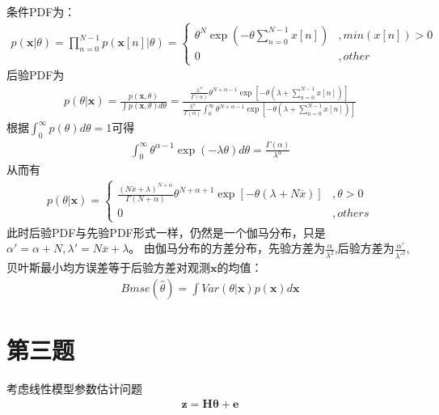 \documentclass[fontset=windows]{article}
\numberwithin{figure}{section}
\begin{document}
条件PDF为：
\begin{align*}
	p(\mathbf{x}|\theta)=\prod_{n=0}^{N-1}p(\mathbf{x}[n]|\theta)=
	\left\{
	\begin{matrix}
		\theta^N\exp(-\theta \sum_{n=0}^{N-1} x[n]) & ,min(x[n])>0 \\
		0                                           & ,other
	\end{matrix}
	\right.
\end{align*}
后验PDF为
\begin{align*}
	p(\theta|\mathbf{x})=\frac{p(\mathbf{x},\theta)}{\int p(\mathbf{x},\theta)d\theta}
	=\frac{\frac{\lambda ^\alpha}{\Gamma(\alpha)}\theta^{N+\alpha-1}
		\exp\left[-\theta (\lambda+\sum_{n=0}^{N-1}x[n])\right]}
	{\frac{\lambda ^\alpha}{\Gamma(\alpha)}\int_0^{\infty}\theta^{N+\alpha-1}
		\exp \left[ -\theta (\lambda+\sum_{n=0}^{N-1}x[n]) \right]}
\end{align*}
根据\(\int_0^{\infty}p(\theta)d\theta=1\)可得
\begin{align*}
	\int_{0}^{\infty} \theta^{\alpha-1}\exp (-\lambda \theta)d\theta=
	\frac{\Gamma(\alpha)}{\lambda^{\alpha}}
\end{align*}
从而有
\begin{align*}
	p(\theta|\mathbf{x})=\left\{
	\begin{matrix}
		\frac{(N\overline{x}+\lambda)^{N+\alpha}}{\Gamma(N+\alpha)}
		\theta^{N+\alpha+1}\exp \left[ -\theta (\lambda+N \overline{x})\right] & ,\theta>0 \\
		0                                                                      & ,others
	\end{matrix}
	\right.
\end{align*}
此时后验PDF与先验PDF形式一样，仍然是一个伽马分布，只是\(\alpha'=\alpha+N,\lambda'=N\overline{x}+\lambda\)。
由伽马分布的方差分布，先验方差为\(\frac{\alpha}{\lambda^2}\),后验方差为\(\frac{\alpha'}{\lambda'^2}\),
贝叶斯最小均方误差等于后验方差对观测\(\mathbf{x}\)的均值：
\begin{align*}
	Bmse(\hat{\theta})=\int Var(\theta|\mathbf{x})p(\mathbf{x})d\mathbf{x}
\end{align*}

\section{第三题}
考虑线性模型参数估计问题
\begin{align*}
	\mathbf{z}=\mathbf{H}\boldsymbol{\theta}+\mathbf{e}
\end{align*}
\end{document}
